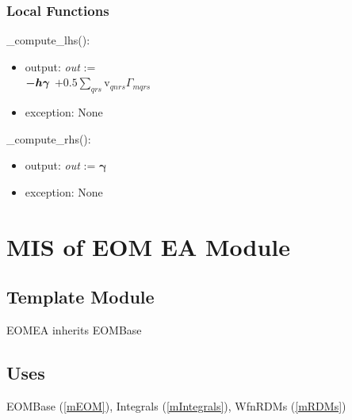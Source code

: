 \documentclass[12pt, titlepage]{article}
\begin{document}
%

\subsubsection{Local Functions}

\noindent \_compute\_lhs():
\begin{itemize}
	\item output: \textit{out} :=\\
	$-\boldmath{h}\boldsymbol{\gamma}$ $+ 0.5\sum_{qrs}$v$_{qnrs} \Gamma_{mqrs}$
	\item exception: None 
\end{itemize}

\noindent\_compute\_rhs():
\begin{itemize}
	\item output: \textit{out} := $\boldsymbol{\gamma}$
	\item exception: None 
\end{itemize}

\newpage

\section{MIS of EOM EA Module} \label{mEOMEA}

\subsection{Template Module}

EOMEA inherits EOMBase

\subsection{Uses}
EOMBase (\ref{mEOM}), Integrals (\ref{mIntegrals}), WfnRDMs (\ref{mRDMs})
\end{document}
